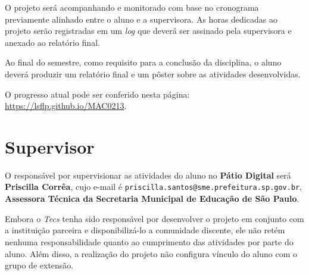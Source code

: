 \documentclass{article}
\begin{document}
O projeto será acompanhando e monitorado com base no cronograma previamente alinhado entre o aluno e a supervisora. As horas dedicadas ao projeto serão registradas em um \textit{log} que deverá ser assinado pela supervisora e anexado ao relatório final.

Ao final do semestre, como requisito para a conclusão da disciplina, o aluno deverá produzir um relatório final e um pôster sobre as atividades desenvolvidas.

O progresso atual pode ser conferido nesta página:  \url{https://lsflp.github.io/MAC0213}.

\section{Supervisor}

O responsável por supervisionar as atividades do aluno  no \textbf{Pátio Digital} será \textbf{Priscilla Corrêa}, cujo e-mail é \texttt{priscilla.santos@sme.prefeitura.sp.gov.br}, \textbf{Assessora Técnica da Secretaria Municipal de Educação de São Paulo}.

Embora o \textit{Tecs} tenha sido responsável por desenvolver o projeto em conjunto com a instituição parceira e disponibilizá-lo a comunidade discente, ele não retém nenhuma responsabilidade quanto ao cumprimento das atividades por parte do aluno. Além disso, a realização do projeto não configura vínculo do aluno com o grupo de extensão.
\end{document}
